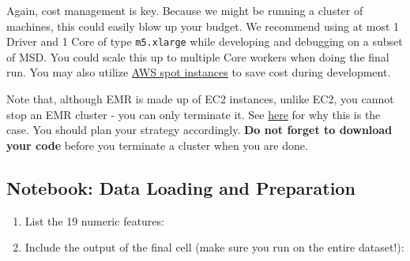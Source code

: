 Again, cost management is key. Because we might be running a cluster of machines, this could easily blow up your budget. We recommend using at most 1 Driver and 1 Core of type \texttt{m5.xlarge} while developing and debugging on a subset of MSD. You could scale this up to multiple Core workers when doing the final run. You may also utilize \href{https://aws.amazon.com/ec2/spot/}{AWS spot instances} to save cost during development.

Note that, although EMR is made up of EC2 instances, unlike EC2, you cannot stop an EMR cluster - you can only terminate it. See \href{https://forums.aws.amazon.com/thread.jspa?threadID=149772}{here} for why this is the case. You should plan your strategy accordingly. \textbf{Do not forget to download your code} before you terminate a cluster when you are done.

\subsection{Notebook: Data Loading and Preparation}
\begin{enumerate}[label=(\alph*)]
    \item {}List the 19 numeric features:\hbox{}
    
        \begin{tcolorbox}[fit,height=4cm, blank, borderline={1pt}{-2pt},nobeforeafter]
        \end{tcolorbox}
        
    \item {}Include the output of the final cell  (make sure you run on the entire dataset!):\hbox{}
    
        \begin{tcolorbox}[fit,height=6cm, blank, borderline={1pt}{-2pt},nobeforeafter]
        \end{tcolorbox}
        
\end{enumerate}

    

